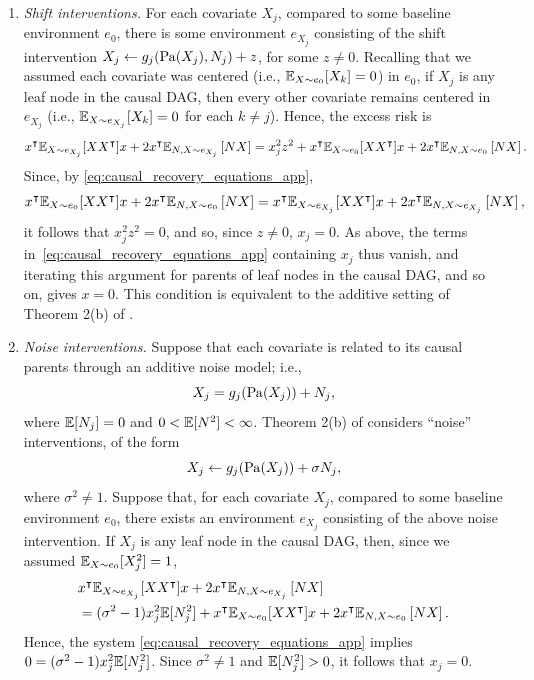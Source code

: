 \documentclass{article}
\begin{document}
\begin{enumerate}[itemsep=1em]
    \item \textit{Shift interventions.} For each covariate $X_j$, compared to some baseline environment $e_0$, there is some environment $e_{X_j}$ consisting of the shift intervention $X_j \leftarrow g_j(\mathrm{Pa}(X_j), N_j) + z$, for some $z \neq 0$. Recalling that we assumed each covariate was centered (i.e., $\operatorname{\mathbb{E}}_{X \sim e_0}[X_k] = 0$) in $e_0$, if $X_j$ is any leaf node in the causal DAG, then every other covariate remains centered in $e_{X_j}$ (i.e., $\operatorname{\mathbb{E}}_{X \sim e_{X_j}}[X_k] = 0$ for each $k \neq j$). Hence, the excess risk is
    \[x^\intercal \mathbb{E}_{X \sim e_{X_j}}[X X^\intercal] x
            + 2 x^\intercal \mathbb{E}_{N,X \sim e_{X_j}} \left[ N X \right]
      = x_j^2 z^2 + x^\intercal \mathbb{E}_{X \sim e_0}[X X^\intercal] x + 2 x^\intercal \mathbb{E}_{N,X \sim e_0} \left[ N X \right].\]
    Since, by \eqref{eq:causal_recovery_equations_app},
    \[x^\intercal \mathbb{E}_{X \sim e_0}[X X^\intercal] x
            + 2 x^\intercal \mathbb{E}_{N,X \sim e_0} \left[ N X \right]
      = x^\intercal \mathbb{E}_{X \sim e_{X_j}}[X X^\intercal] x
            + 2 x^\intercal \mathbb{E}_{N,X \sim e_{X_j}} \left[ N X \right],\]
    it follows that $x_j^2z^2 = 0$, and so, since $z \neq 0$, $x_j = 0$. As above, the terms in~\eqref{eq:causal_recovery_equations_app} containing $x_j$ thus vanish, and iterating this argument for parents of leaf nodes in the causal DAG, and so on, gives $x = 0$.
     This condition is equivalent to the additive setting of Theorem 2(b) of \citet{peters2016causal}.
    
    \item \textit{Noise interventions.} Suppose that each covariate is related to its causal parents through an additive noise model; i.e.,
    \[X_j = g_j(\mathrm{Pa}(X_j)) + N_j,\]
    where
    $\operatorname{\mathbb{E}}[N_j] = 0$ and $0 < \operatorname{\mathbb{E}}[N^2] < \infty$. Theorem 2(b) of \citet{peters2016causal} considers ``noise'' interventions, of the form
    \[X_j \leftarrow g_j(\mathrm{Pa}(X_j)) + \sigma N_j,\]
    where $\sigma^2 \neq 1$. Suppose that, for each covariate $X_j$, compared to some baseline environment $e_0$, there exists an environment $e_{X_j}$ consisting of the above noise intervention. If $X_j$ is any leaf node in the causal DAG, then, since we assumed $\mathbb{E}_{X \sim e_0}[X_j^2] = 1$,
    \begin{align*}
        & x^\intercal \mathbb{E}_{X \sim e_{X_j}}[X X^\intercal] x
            + 2 x^\intercal \mathbb{E}_{N,X \sim e_{X_j}} \left[ N X \right] \\
        & = (\sigma^2 - 1) x_j^2 \mathbb{E}[N_j^2]
          + x^\intercal \mathbb{E}_{X \sim e_0}[X X^\intercal] x
            + 2 x^\intercal \mathbb{E}_{N,X \sim e_0} \left[ N X \right].
    \end{align*}
    Hence, the system \eqref{eq:causal_recovery_equations_app} implies $0 = (\sigma^2 - 1) x_j^2 \mathbb{E}[N_j^2]$.
    Since $\sigma^2 \neq 1$ and $\mathbb{E}[N_j^2] > 0$, it follows that $x_j = 0$.
    

\end{enumerate}
\end{document}
